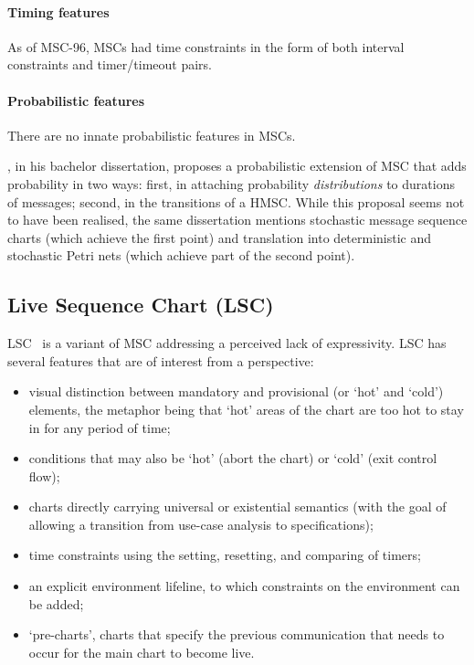 \paragraph{Timing features}
As of MSC-96, MSCs had time constraints in the form of both interval
constraints and timer/timeout pairs.

\paragraph{Probabilistic features}
There are no innate probabilistic features in MSCs.

\textcite{Krivanek09-PMSC}, in his bachelor dissertation, proposes a
probabilistic extension of MSC that adds probability in two
ways: first, in attaching probability \emph{distributions} to
durations of messages; second, in the transitions of a HMSC.  While
this proposal seems not to have been realised, the same
dissertation mentions stochastic message sequence charts (which
achieve the first point) and translation into deterministic and
stochastic Petri nets (which achieve part of the second point).

\subsection{Live Sequence Chart (LSC)}

LSC~\cite{lsc} is a
variant of MSC addressing a perceived lack of expressivity.
LSC has several features that are of interest from a \langname{} perspective:

\begin{itemize}
\item visual distinction between mandatory and provisional (or `hot'
  and `cold') elements, the metaphor being that `hot' areas of the
  chart are too hot to stay in for any period of time;
\item conditions that may also be `hot' (abort the
  chart) or `cold' (exit control flow);
\item charts directly carrying universal or existential semantics (with the
  goal of allowing a transition from use-case analysis to specifications);
\item time constraints using the setting, resetting, and comparing of timers;
\item an explicit environment lifeline, to which constraints on the
  environment can be added;
\item `pre-charts', charts that specify the previous communication
  that needs to occur for the main chart to become live.
\end{itemize}

